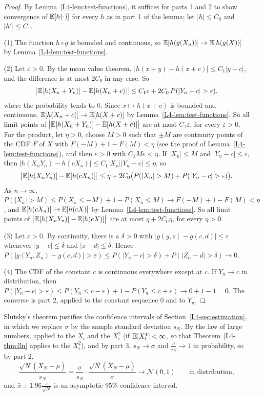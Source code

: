 \begin{proof}
    By Lemma~\ref{L4-lem:test-functions}, it suffices for parts 1 and 2 to show convergence of $\mathbb{E}[h(\cdot)]$ for every $h$ as in part 1 of the lemma; let $|h| \leq C_0$ and $|h'| \leq C_1$.

    (1) The function $h \circ g$ is bounded and continuous, so $\mathbb{E}[h(g(X_n))] \to \mathbb{E}[h(g(X))]$ by Lemma~\ref{L4-lem:test-functions}.

    (2) Let $\varepsilon > 0$. By the mean value theorem, $|h(x + y) - h(x + c)| \leq C_1|y - c|$, and the difference is at most $2C_0$ in any case. So
    \[\big|\mathbb{E}[h(X_n + Y_n)] - \mathbb{E}[h(X_n + c)]\big| \leq C_1\varepsilon + 2C_0\,P(|Y_n - c| > \varepsilon),\]
    where the probability tends to $0$. Since $x \mapsto h(x + c)$ is bounded and continuous, $\mathbb{E}[h(X_n + c)] \to \mathbb{E}[h(X + c)]$ by Lemma~\ref{L4-lem:test-functions}. So all limit points of $\big|\mathbb{E}[h(X_n + Y_n)] - \mathbb{E}[h(X + c)]\big|$ are at most $C_1\varepsilon$, for every $\varepsilon > 0$. For the product, let $\eta > 0$, choose $M > 0$ such that $\pm M$ are continuity points of the CDF $F$ of $X$ with $F(-M) + 1 - F(M) < \eta$ (see the proof of Lemma~\ref{L4-lem:test-functions}), and then $\varepsilon > 0$ with $C_1M\varepsilon < \eta$. If $|X_n| \leq M$ and $|Y_n - c| \leq \varepsilon$, then $|h(X_nY_n) - h(cX_n)| \leq C_1|X_n||Y_n - c| \leq \eta$, so
    \[\big|\mathbb{E}[h(X_nY_n)] - \mathbb{E}[h(cX_n)]\big| \leq \eta + 2C_0\big(P(|X_n| > M) + P(|Y_n - c| > \varepsilon)\big).\]
    As $n \to \infty$, $P(|X_n| > M) \leq P(X_n \leq -M) + 1 - P(X_n \leq M) \to F(-M) + 1 - F(M) < \eta$, and $\mathbb{E}[h(cX_n)] \to \mathbb{E}[h(cX)]$ by Lemma~\ref{L4-lem:test-functions}. So all limit points of $\big|\mathbb{E}[h(X_nY_n)] - \mathbb{E}[h(cX)]\big|$ are at most $\eta + 2C_0\eta$, for every $\eta > 0$.

    (3) Let $\varepsilon > 0$. By continuity, there is a $\delta > 0$ with $|g(y, z) - g(c, d)| \leq \varepsilon$ whenever $|y - c| \leq \delta$ and $|z - d| \leq \delta$. Hence $P(|g(Y_n, Z_n) - g(c, d)| > \varepsilon) \leq P(|Y_n - c| > \delta) + P(|Z_n - d| > \delta) \to 0$.

    (4) The CDF of the constant $c$ is continuous everywhere except at $c$. If $Y_n \to c$ in distribution, then $P(|Y_n - c| > \varepsilon) \leq P(Y_n \leq c - \varepsilon) + 1 - P(Y_n \leq c + \varepsilon) \to 0 + 1 - 1 = 0$. The converse is part 2, applied to the constant sequence $0$ and to $Y_n$.
\end{proof}

Slutsky's theorem justifies the confidence intervals of Section~\ref{L4-sec:estimation}, in which we replace $\sigma$ by the sample standard deviation $s_N$. By the law of large numbers, applied to the $X_i$ and the $X_i^2$ (if $\mathbb{E}[X_i^4] < \infty$, so that Theorem~\ref{L4-thm:lln} applies to the $X_i^2$), and by part 3, $s_N \to \sigma$ and $\frac{\sigma}{s_N} \to 1$ in probability, so by part 2,
\[\frac{\sqrt{N}(\bar X_N - \mu)}{s_N} = \frac{\sigma}{s_N} \cdot \frac{\sqrt{N}(\bar X_N - \mu)}{\sigma} \to \mathcal{N}(0, 1) \qquad \text{in distribution},\]
and $\bar x \pm 1.96\frac{s}{\sqrt{N}}$ is an asymptotic $95\%$ confidence interval.

